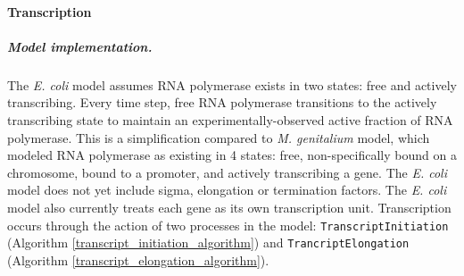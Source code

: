 \documentclass[12pt]{article}
\begin{document}
\baselineskip24pt

\paragraph{Transcription}

\subparagraph{Model implementation.}
The \emph{E. coli} model assumes RNA polymerase exists in two states: free and actively transcribing. Every time step, free RNA polymerase transitions to the actively transcribing state to maintain an experimentally-observed active fraction of RNA polymerase. This is a simplification compared to \emph{M. genitalium} model, which modeled RNA polymerase as existing in 4 states: free, non-specifically bound on a chromosome, bound to a promoter, and actively transcribing a gene.  The \emph{E. coli} model does not yet include sigma, elongation or termination factors. The \textit{E. coli} model also currently treats each gene as its own transcription unit.
Transcription occurs through the action of two processes in the model: \texttt{TranscriptInitiation} (Algorithm \ref{transcript_initiation_algorithm}) and \texttt{TrancriptElongation} (Algorithm \ref{transcript_elongation_algorithm}).
\end{document}
